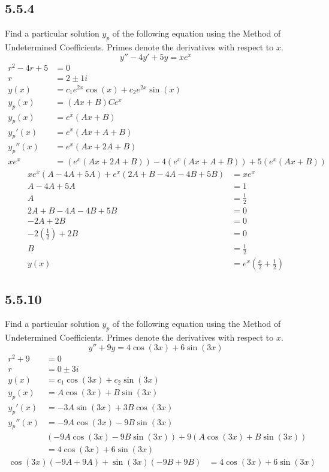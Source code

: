 \documentclass{article}
\begin{document}
\subsection{5.5.4}
Find a particular solution $ y_p $ of the following equation using the Method of Undetermined Coefficients. Primes denote the derivatives with respect to $ x $.
$$ y'' - 4y' + 5y = xe^x $$
\begin{align*}
	r^2 - 4r + 5 & = 0 \\
	r & = 2 \pm 1i \\
	y(x) & = c_1e^{2x}\cos(x) + c_2e^{2x}\sin(x) \\
	y_p(x) & = (Ax + B)Ce^x \\
	y_p(x) & = e^x(Ax + B) \\
	y_p'(x) & = e^x(Ax + A + B) \\
	y_p''(x) & = e^x(Ax + 2A + B) \\
	xe^x & = (e^x(Ax + 2A + B)) - 4(e^x(Ax + A + B)) + 5(e^x(Ax + B))
\end{align*}
\begin{align*}
	xe^x(A - 4A + 5A) + e^x(2A + B - 4A - 4B + 5B) & = xe^x \\
	A - 4A + 5A & = 1 \\
	A & = \frac{1}{2} \\
	2A + B - 4A - 4B + 5B & = 0 \\
	-2A + 2B & = 0 \\
	-2 \left( \frac{1}{2} \right) + 2B & = 0 \\
	B & = \frac{1}{2} \\
	y(x) & = e^x \left( \frac{x}{2} + \frac{1}{2} \right)
\end{align*}

\subsection{5.5.10}
Find a particular solution $ y_p $ of the following equation using the Method of Undetermined Coefficients. Primes denote the derivatives with respect to $ x $.
$$ y'' + 9y = 4\cos(3x) + 6\sin(3x) $$
\begin{align*}
	r^2 + 9 & = 0 \\
	r & = 0 \pm 3i \\
	y(x) & = c_1\cos(3x) + c_2\sin(3x) \\
	y_p(x) & = A\cos(3x) + B\sin(3x) \\
	y_p'(x) & = -3A\sin(3x) + 3B\cos(3x) \\
	y_p''(x) & = -9A\cos(3x) - 9B\sin(3x) \\
			 & (-9A\cos(3x) - 9B\sin(3x)) + 9(A\cos(3x) + B\sin(3x)) \\
			 & = 4\cos(3x) + 6\sin(3x)
\end{align*}
\begin{align*}
	\cos(3x)(-9A + 9A) + \sin(3x)(-9B + 9B) & = 4\cos(3x) + 6\sin(3x)
\end{align*}
\end{document}
